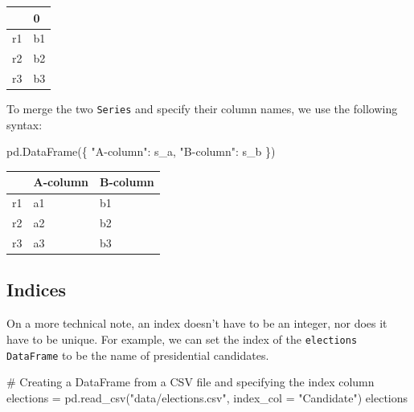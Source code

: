 \documentclass[
  letterpaper,
  DIV=11,
  numbers=noendperiod]{scrreprt}
\newenvironment{Shaded}{\begin{snugshade}}{\end{snugshade}}
\newcommand{\CommentTok}[1]{\textcolor[rgb]{0.37,0.37,0.37}{#1}}
\newcommand{\NormalTok}[1]{\textcolor[rgb]{0.00,0.23,0.31}{#1}}
\newcommand{\OperatorTok}[1]{\textcolor[rgb]{0.37,0.37,0.37}{#1}}
\newcommand{\StringTok}[1]{\textcolor[rgb]{0.13,0.47,0.30}{#1}}
\begin{document}
\begin{longtable}[]{@{}ll@{}}
\toprule\noalign{}
& 0 \\
\midrule\noalign{}
\endhead
\bottomrule\noalign{}
\endlastfoot
r1 & b1 \\
r2 & b2 \\
r3 & b3 \\
\end{longtable}

To merge the two \texttt{Series} and specify their column names, we use
the following syntax:

\begin{Shaded}
\begin{Highlighting}[]
\NormalTok{pd.DataFrame(\{}
    \StringTok{"A{-}column"}\NormalTok{: s\_a, }
    \StringTok{"B{-}column"}\NormalTok{: s\_b}
\NormalTok{\})}
\end{Highlighting}
\end{Shaded}

\begin{longtable}[]{@{}lll@{}}
\toprule\noalign{}
& A-column & B-column \\
\midrule\noalign{}
\endhead
\bottomrule\noalign{}
\endlastfoot
r1 & a1 & b1 \\
r2 & a2 & b2 \\
r3 & a3 & b3 \\
\end{longtable}

\subsection{Indices}\label{indices}

On a more technical note, an index doesn't have to be an integer, nor
does it have to be unique. For example, we can set the index of the
\texttt{elections} \texttt{DataFrame} to be the name of presidential
candidates.

\begin{Shaded}
\begin{Highlighting}[]
\CommentTok{\# Creating a DataFrame from a CSV file and specifying the index column}
\NormalTok{elections }\OperatorTok{=}\NormalTok{ pd.read\_csv(}\StringTok{"data/elections.csv"}\NormalTok{, index\_col }\OperatorTok{=} \StringTok{"Candidate"}\NormalTok{)}
\NormalTok{elections}
\end{Highlighting}
\end{Shaded}
\end{document}
